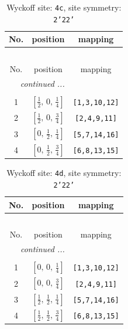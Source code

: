 \documentclass[fleqn,8pt]{jsarticle}
\begin{document}
\renewcommand{\arraystretch}{1.2}
\begin{longtable}{ccc}
\caption{Wyckoff site: {\tt 4c}, site symmetry: {\tt 2'22'}}
 \\
 \hline \hline
No. & position & mapping \\ \hline \endfirsthead

\multicolumn{2}{l}{\tablename\ \thetable{}} \\
 \hline \hline
No. & position & mapping \\ \hline \endhead

 \hline \hline
\multicolumn{2}{r}{\footnotesize\it continued ...} \\ \endfoot

 \hline \hline
\multicolumn{2}{r}{} \\ \endlastfoot

1 & $\left[ \frac{1}{2},\, 0,\, \frac{1}{4} \right]$ & {\tt [1,3,10,12]} \\ \hline
2 & $\left[ \frac{1}{2},\, 0,\, \frac{3}{4} \right]$ & {\tt [2,4,9,11]} \\ \hline
3 & $\left[ 0,\, \frac{1}{2},\, \frac{1}{4} \right]$ & {\tt [5,7,14,16]} \\ \hline
4 & $\left[ 0,\, \frac{1}{2},\, \frac{3}{4} \right]$ & {\tt [6,8,13,15]} \\
\end{longtable}
\renewcommand{\arraystretch}{1.2}
\begin{longtable}{ccc}
\caption{Wyckoff site: {\tt 4d}, site symmetry: {\tt 2'22'}}
 \\
 \hline \hline
No. & position & mapping \\ \hline \endfirsthead

\multicolumn{2}{l}{\tablename\ \thetable{}} \\
 \hline \hline
No. & position & mapping \\ \hline \endhead

 \hline \hline
\multicolumn{2}{r}{\footnotesize\it continued ...} \\ \endfoot

 \hline \hline
\multicolumn{2}{r}{} \\ \endlastfoot

1 & $\left[ 0,\, 0,\, \frac{1}{4} \right]$ & {\tt [1,3,10,12]} \\ \hline
2 & $\left[ 0,\, 0,\, \frac{3}{4} \right]$ & {\tt [2,4,9,11]} \\ \hline
3 & $\left[ \frac{1}{2},\, \frac{1}{2},\, \frac{1}{4} \right]$ & {\tt [5,7,14,16]} \\ \hline
4 & $\left[ \frac{1}{2},\, \frac{1}{2},\, \frac{3}{4} \right]$ & {\tt [6,8,13,15]} \\
\end{longtable}
\end{document}
